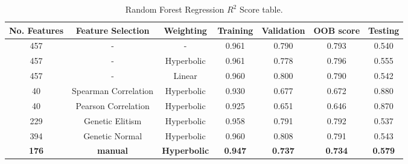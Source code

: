 \documentclass[11pt]{article}
\begin{document}
\begin{table} [h!]
\centering
\resizebox{\linewidth}{!} {
 \begin{tabular}{ | c | c |  c | c | c | c | c |}
\hline
\textbf{No.  Features} & \textbf{Feature Selection} & \textbf{Weighting} & \textbf{Training} & \textbf{Validation} & \textbf{OOB score} & \textbf{Testing} \\ [0.5 ex]
\hline \hline
457 & - & - & 0.961 & 0.790 & 0.793 & 0.540\\
457 & - & Hyperbolic &  0.961 & 0.778 & 0.796 & 0.555\\
457 & - & Linear &  0.960 & 0.800 & 0.790 & 0.542\\
40 & Spearman Correlation & Hyperbolic &  0.930 & 0.677 & 0.672 & 0.880  \\ 
40 & Pearson Correlation & Hyperbolic &  0.925 & 0.651 & 0.646 & 0.870  \\ 
229 & Genetic Elitism & Hyperbolic  & 0.958 &  0.791 & 0.792 & 0.537 \\
394 & Genetic Normal& Hyperbolic & 0.960 & 0.808 & 0.791 & 0.543 \\
\textbf{176} & \textbf{manual}  & \textbf{Hyperbolic} &  \textbf{0.947} & \textbf{0.737} & \textbf{0.734} & \textbf{0.579}  \\ [1ex]
\hline
\end{tabular}
}
\caption{Random Forest Regression $R^2$ Score table.}
\label {table:3}
\end{table}
\end{document}
